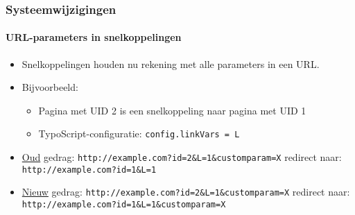 \begin{frame}[fragile]
	\frametitle{Systeemwijzigingen}
	\framesubtitle{URL-parameters in snelkoppelingen}

	\begin{itemize}
		\item Snelkoppelingen houden nu rekening met alle parameters in een URL.
		\item Bijvoorbeeld:

			\begin{itemize}
				\item Pagina met UID 2 is een snelkoppeling naar pagina met UID 1
				\item TypoScript-configuratie: \texttt{config.linkVars = L}
			\end{itemize}

		\item \underline{Oud} gedrag:\newline
			\smaller
				\tabto{0.5cm}\texttt{http://example.com?id=2\&L=1\&customparam=X}\newline
					redirect naar:\newline
				\tabto{0.5cm}\texttt{http://example.com?id=1\&L=1}
			\normalsize

		\item \underline{Nieuw} gedrag:\newline
			\smaller
				\tabto{0.5cm}\texttt{http://example.com?id=2\&L=1\&customparam=X}\newline
					redirect naar:\newline
				\tabto{0.5cm}\texttt{http://example.com?id=1\&L=1\&customparam=X}
			\normalsize

	\end{itemize}

\end{frame}


